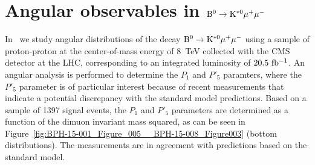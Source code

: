 \documentclass{PoS}
\begin{document}
\section{Angular observables in ${\rm B^0 \to K^{*0}\mu^+\mu^-}$}

In~\cite{bph-15-008} we study angular distributions of the decay
${\rm B^0 \to K^{*0}\mu^+\mu^-}$ using a sample of proton-proton at the
center-of-mass energy of 8~TeV collected with the CMS detector at the LHC,
corresponding to an integrated luminosity of ${\rm 20.5~fb^{-1}}$. An
angular analysis is performed to determine the $P_1$ and $P'_5$ paramters,
where the $P'_5$ parameter is of particular interest because of recent
measurements that indicate a potential discrepancy with the standard model
predictions. Based on a sample of 1397 signal events, the $P_1$ and
$P'_5$ parameters are determined as a function of the dimuon invariant mass
squared, as can be seen in
Figure~\ref{fig:BPH-15-001_Figure_005__BPH-15-008_Figure003}
(bottom distributions). The measurements are in agreement with predictions
based on the standard model.


\end{document}
